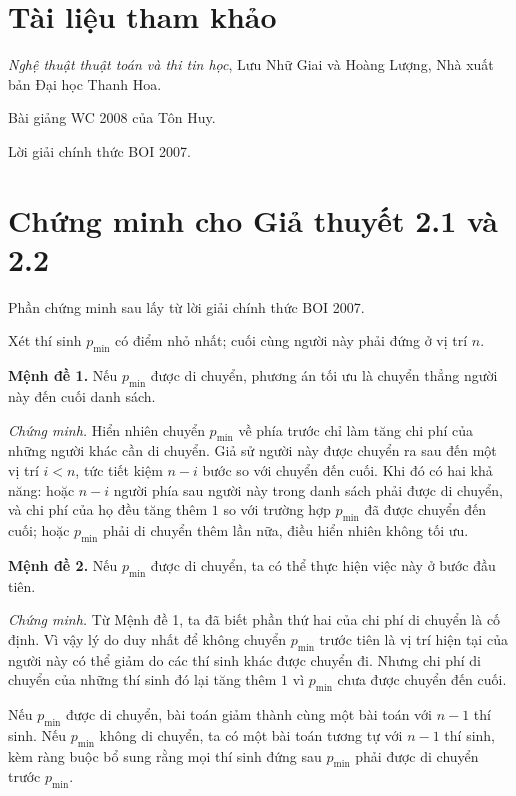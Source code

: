 \documentclass[11pt]{article}
\begin{document}
\section*{Tài liệu tham khảo}

\begin{enumerate}[label={[\Alph*]}]
  \item \textit{Nghệ thuật thuật toán và thi tin học}, Lưu Nhữ Giai và Hoàng
  Lượng, Nhà xuất bản Đại học Thanh Hoa.
  \item Bài giảng WC 2008 của Tôn Huy.
  \item Lời giải chính thức BOI 2007.
\end{enumerate}

\appendix

\section{Chứng minh cho Giả thuyết 2.1 và 2.2}

Phần chứng minh sau lấy từ lời giải chính thức BOI 2007.

Xét thí sinh \(p_{\min}\) có điểm nhỏ nhất; cuối cùng người này phải đứng ở vị
trí \(n\).

\noindent\textbf{Mệnh đề 1.} Nếu \(p_{\min}\) được di chuyển, phương án tối ưu
là chuyển thẳng người này đến cuối danh sách.

\noindent\textit{Chứng minh.} Hiển nhiên chuyển \(p_{\min}\) về phía trước chỉ
làm tăng chi phí của những người khác cần di chuyển. Giả sử người này được
chuyển ra sau đến một vị trí \(i<n\), tức tiết kiệm \(n-i\) bước so với chuyển
đến cuối. Khi đó có hai khả năng: hoặc \(n-i\) người phía sau người này trong
danh sách phải được di chuyển, và chi phí của họ đều tăng thêm \(1\) so với
trường hợp \(p_{\min}\) đã được chuyển đến cuối; hoặc \(p_{\min}\) phải di
chuyển thêm lần nữa, điều hiển nhiên không tối ưu.

\noindent\textbf{Mệnh đề 2.} Nếu \(p_{\min}\) được di chuyển, ta có thể thực
hiện việc này ở bước đầu tiên.

\noindent\textit{Chứng minh.} Từ Mệnh đề 1, ta đã biết phần thứ hai của chi phí
di chuyển là cố định. Vì vậy lý do duy nhất để không chuyển \(p_{\min}\) trước
tiên là vị trí hiện tại của người này có thể giảm do các thí sinh khác được
chuyển đi. Nhưng chi phí di chuyển của những thí sinh đó lại tăng thêm \(1\)
vì \(p_{\min}\) chưa được chuyển đến cuối.

Nếu \(p_{\min}\) được di chuyển, bài toán giảm thành cùng một bài toán với
\(n-1\) thí sinh. Nếu \(p_{\min}\) không di chuyển, ta có một bài toán tương
tự với \(n-1\) thí sinh, kèm ràng buộc bổ sung rằng mọi thí sinh đứng sau
\(p_{\min}\) phải được di chuyển trước \(p_{\min}\).
\end{document}
